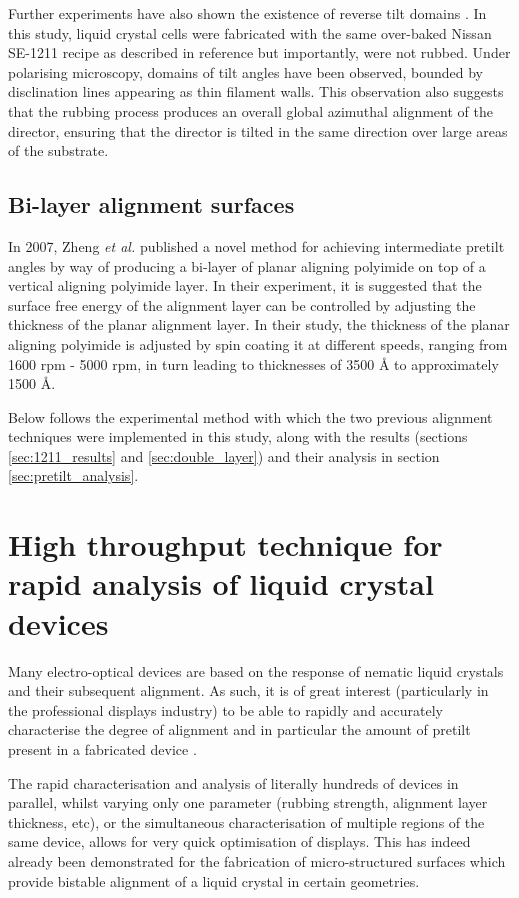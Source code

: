 Further experiments have also shown the existence of reverse tilt domains \cite{Wang2007}. In this study, liquid crystal cells were fabricated with the same over-baked Nissan SE-1211 recipe as described in reference \cite{Huang2005} but importantly, were not rubbed. Under polarising microscopy, domains of tilt angles have been observed, bounded by disclination lines appearing as thin filament walls. This observation also suggests that the rubbing process produces an overall global azimuthal alignment of the director, ensuring that the director is tilted in the same direction over large areas of the substrate.

\subsection{Bi-layer alignment surfaces}
In 2007, Zheng \textit{et al.} \cite{Zheng2007} published a novel method for achieving intermediate pretilt angles by way of producing a bi-layer of planar aligning polyimide on top of a vertical aligning polyimide layer. In their experiment, it is suggested that the surface free energy of the alignment layer can be controlled by adjusting the thickness of the planar alignment layer. In their study, the thickness of the planar aligning polyimide is adjusted by spin coating it at different speeds, ranging from 1600 rpm - 5000 rpm, in turn leading to thicknesses of 3500 $\text{\AA}$  to approximately 1500 \AA.

Below follows the experimental method with which the two previous alignment techniques were implemented in this study, along with the results (sections \ref{sec:1211_results} and \ref{sec:double_layer}) and their analysis in section \ref{sec:pretilt_analysis}.

\section{High throughput technique for rapid analysis of liquid crystal devices}
\label{camerakit}
Many electro-optical devices are based on the response of nematic liquid crystals and their subsequent alignment. As such, it is of great interest (particularly in the professional displays industry) to be able to rapidly and accurately characterise the degree of alignment and in particular the amount of pretilt present in a fabricated device \cite{Edwards2010}. 

The rapid characterisation and analysis of literally hundreds of devices in parallel, whilst varying only one parameter (rubbing strength, alignment layer thickness, etc), or the simultaneous characterisation of multiple regions of the same device, allows for very quick optimisation of displays. This has indeed already been demonstrated for the fabrication of micro-structured surfaces which provide bistable alignment of a liquid crystal \cite{Kitson2002} in certain geometries.

